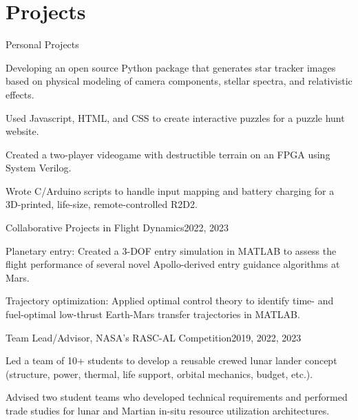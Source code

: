\documentclass[letterpaper,11pt]{article}
\begin{document}
	
	\section{Projects}
	\begin{Experience}
		{Personal Projects}{}
		{
		\item Developing an open source Python package that generates star tracker images based on physical modeling of camera components, stellar spectra, and relativistic effects. 
		\item Used Javascript, HTML, and CSS to create interactive puzzles for a puzzle hunt website. 
		\item Created a two-player videogame with destructible terrain on an FPGA using System Verilog.
		\item Wrote C/Arduino scripts to handle input mapping and battery charging for a 3D-printed, life-size, remote-controlled R2D2.
		}
	\end{Experience}

	
	\begin{Experience}
		{Collaborative Projects in Flight Dynamics}{2022, 2023}
		{
		\item Planetary entry: Created a 3-DOF entry simulation in MATLAB to assess the flight performance of several novel Apollo-derived entry guidance algorithms at Mars.
		\item Trajectory optimization: Applied optimal control theory to identify time- and fuel-optimal low-thrust Earth-Mars transfer trajectories in MATLAB. 
		}
	\end{Experience}
	
	\begin{Experience}
		{Team Lead/Advisor, NASA's RASC-AL Competition}{2019, 2022, 2023}
		{
		\item Led a team of 10+ students to develop a reusable crewed lunar lander concept (structure, power, thermal, life support, orbital mechanics, budget, etc.). 
		\item Advised two student teams who developed technical requirements and performed trade studies for lunar and Martian in-situ resource utilization architectures.
		}
	\end{Experience}



\end{document}
